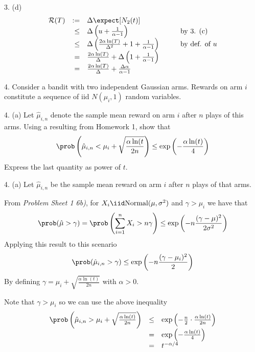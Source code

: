 \documentclass[11pt,a4paper]{article}
\begin{document}
\begin{answer}{3. (d)}
  \[\begin{array}{rrlcl}
  \mathcal{R}(T)&:=&\Delta\expect[N_2(t)]&\quad&\\
  &\leq&\Delta\left(u+\frac1{\alpha-1}\right)&&\text{by 3. (c)}\\
  &\leq&\Delta\left(\frac{2\alpha\ln(T)}{\Delta^2}+1+\frac1{\alpha-1}\right)&&\text{by def. of }u\\
  &=&\frac{2\alpha\ln(T)}{\Delta}+\Delta\left(1+\frac1{\alpha-1}\right)\\
  &=&\frac{2\alpha\ln(T)}{\Delta}+\frac{\Delta\alpha}{\alpha-1}
  \end{array}\]
\end{answer}

\begin{question}{4.}
  Consider a bandit with two independent Gaussian arms. Rewards on arm $i$ constitute a sequence of iid $N(\mu_i,1)$ random variables.
\end{question}

\begin{question}{4. (a)}
  Let $\hat\mu_{i,n}$ denote the sample mean reward on arm $i$ after $n$ plays of this arms. Using a resulting from Homework 1, show that
  \[ \prob\left(\hat\mu_{i,n}<\mu_i+\sqrt{\frac{\alpha\ln(t}{2n}}\right)\leq\exp\left(-\frac{\alpha\ln(t)}4\right) \]
  Express the last quantity as power of $t$.
\end{question}

\begin{answer}{4. (a)}
  Let $\hat\mu_{i,n}$ be the sample mean reward on arm $i$ after $n$ plays of that arms.
  \par From \textit{Problem Sheet 1 6b)}, for $X_i\iid\text{Normal}(\mu,\sigma^2)$ and $\gamma>\mu_i$ we have that
  \[ \prob(\hat\mu>\gamma)=\prob\left(\sum_{i=1}^n X_i>n\gamma\right)\leq\exp\left(-n\frac{(\gamma-\mu)^2}{2\sigma^2}\right) \]
  Applying this result to this scenario
  \[ \prob(\hat\mu_{i,n}>\gamma)\leq\exp\left(-n\frac{(\gamma-\mu_i)^2}2\right) \]
  By defining $\gamma=\mu_i+\sqrt{\frac{\alpha\ln(t)}{2n}}$ with $\alpha>0$.
  \par Note that $\gamma>\mu_i$ so we can use the above inequality
  \[\begin{array}{rcl}
  \prob\left(\hat\mu_{i,n}>\mu_i+\sqrt{\frac{\alpha\ln(t)}{2n}}\right)&\leq&\exp\left(-\frac{n}2\cdot\frac{\alpha\ln(t)}{2n}\right)\\
  &=&\exp\left(-\frac{\alpha\ln(t)}4\right)\\
  &=&t^{-\alpha/4}
  \end{array}\]
\end{answer}
\end{document}
